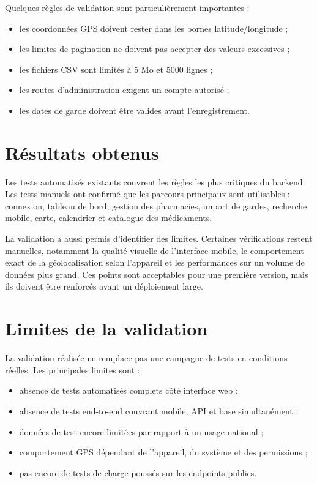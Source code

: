 Quelques règles de validation sont particulièrement importantes :

\begin{itemize}
    \item les coordonnées GPS doivent rester dans les bornes latitude/longitude ;
    \item les limites de pagination ne doivent pas accepter des valeurs excessives ;
    \item les fichiers CSV sont limités à 5 Mo et 5000 lignes ;
    \item les routes d'administration exigent un compte autorisé ;
    \item les dates de garde doivent être valides avant l'enregistrement.
\end{itemize}

\section{Résultats obtenus}

Les tests automatisés existants couvrent les règles les plus critiques du backend. Les tests manuels ont
confirmé que les parcours principaux sont utilisables : connexion, tableau de bord, gestion des
pharmacies, import de gardes, recherche mobile, carte, calendrier et catalogue des médicaments.

La validation a aussi permis d'identifier des limites. Certaines vérifications restent manuelles, notamment
la qualité visuelle de l'interface mobile, le comportement exact de la géolocalisation selon l'appareil et
les performances sur un volume de données plus grand. Ces points sont acceptables pour une première
version, mais ils doivent être renforcés avant un déploiement large.

\section{Limites de la validation}

La validation réalisée ne remplace pas une campagne de tests en conditions réelles. Les principales
limites sont :

\begin{itemize}
    \item absence de tests automatisés complets côté interface web ;
    \item absence de tests end-to-end couvrant mobile, API et base simultanément ;
    \item données de test encore limitées par rapport à un usage national ;
    \item comportement GPS dépendant de l'appareil, du système et des permissions ;
    \item pas encore de tests de charge poussés sur les endpoints publics.
\end{itemize}

